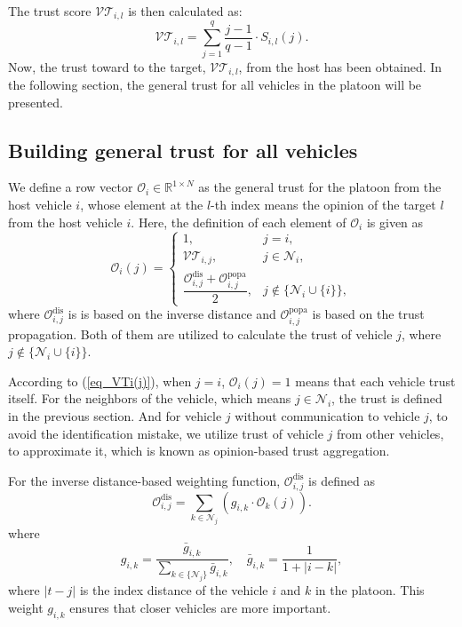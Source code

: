\documentclass[letterpaper, 10pt, conference]{ieeeconf}  %
\def\eqref#1{(\ref{#1})}
\def\N{\mathcal{N}} %
\def\VT{\mathcal{VT}} %
\def\O{\mathcal{O}} %
\begin{document}
The trust score $\VT_{i,l}$ is then calculated as:
\begin{equation}
    \VT_{i,l} = \sum_{j=1}^{q} \dfrac{j-1}{q-1} \cdot S_{i,l}(j).
\end{equation}
Now, the trust toward to the target, $\VT_{i,l}$, from the host has been obtained. In the following section, the general trust for all vehicles in the platoon will be presented.

\subsection{Building general trust for all vehicles}
We define a row vector $\O_{i} \in \mathbb{R}^{1 \times N}$ as the general trust for the platoon from the host vehicle $i$, whose element at the $l$-th index means the opinion of the target $l$ from the host vehicle $i$. Here, the definition of each element of  $\O_{i}$ is given as
\begin{equation}
    \O_{i}(j) = \begin{cases}
        1, & j = i,\\
        \VT_{i,j}, & j \in \N_{i},\\
        \dfrac{\O_{i,j}^{\text{dis}} +  \O_{i,j}^{\text{popa}} }{2}, & j \notin \{\N_{i} \cup  \{ i \}\}, 
    \end{cases} 
    \label{eq_VTi(j)}
\end{equation}
where $\O_{i,j}^{\text{dis}}$ is is based on the inverse distance and $\O_{i,j}^{\text{popa}}$ is  based on the trust propagation. Both of them are utilized to calculate the trust of vehicle $j$, where $j \notin \{\N_{i} \cup  \{ i \}\}$. 

According to \eqref{eq_VTi(j)}, when $j = i$, $\O_{i}(j)= 1$ means that each vehicle trust itself. For the neighbors of the vehicle, which means $j \in \N_{i}$, the trust is defined in the previous section. And for vehicle $j$ without communication to vehicle $j$, 
to avoid the identification mistake, we utilize trust of vehicle $j$ from other vehicles, to approximate it, which is known as opinion-based trust aggregation.  

For the inverse distance-based weighting function, $\O_{i,j}^{\text{dis}}$ is defined as
\begin{equation}
   \O_{i,j}^{\text{dis}} = \displaystyle \sum_{k \in \N_{j}  } \left( g_{i,k} \cdot \O_{k}(j) \right). 
\end{equation}
where 
\begin{equation}
    g_{i,k} = \dfrac{\bar{g}_{i,k}}{\sum_{k \in \{\N_{j} \}  } \bar{g}_{i,k}}, \quad \bar{g}_{i,k} = \dfrac{1}{1 + |i - k|},
\end{equation}
where $|t - j|$ is the index distance of the vehicle $i$ and $k$ in the platoon. 
This weight ${g}_{i,k}$ ensures that closer vehicles are more important. 
\end{document}
